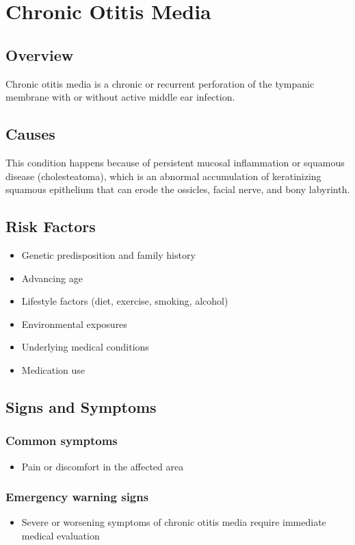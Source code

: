 \chapter{Chronic Otitis Media}
\label{sec:Chronic Otitis Media}

\section{Overview}
Chronic otitis media is a chronic or recurrent perforation of the tympanic membrane with or without active middle ear infection.
\section{Causes}
This condition happens because of persistent mucosal inflammation or squamous disease (cholesteatoma), which is an abnormal accumulation of keratinizing squamous epithelium that can erode the ossicles, facial nerve, and bony labyrinth.     
\section{Risk Factors}

\begin{itemize}[noitemsep]
  \item Genetic predisposition and family history
  \item Advancing age
  \item Lifestyle factors (diet, exercise, smoking, alcohol)
  \item Environmental exposures
  \item Underlying medical conditions
  \item Medication use
\end{itemize}
\section{Signs and Symptoms}

\subsection{Common symptoms}
\begin{itemize}[noitemsep]
  \item Pain or discomfort in the affected area
  \end{itemize}

\subsection{Emergency warning signs}
\begin{itemize}[noitemsep]
  \item Severe or worsening symptoms of chronic otitis media require immediate medical evaluation
\end{itemize}
